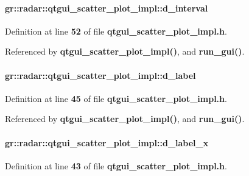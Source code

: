 \paragraph[{d\+\_\+interval}]{ gr\+::radar\+::qtgui\+\_\+scatter\+\_\+plot\+\_\+impl\+::d\+\_\+interval}\label{classgr_1_1radar_1_1qtgui__scatter__plot__impl_a67a3d6aa0cbaaca5b978292cc1c82f67}


Definition at line {\bf 52} of file {\bf qtgui\+\_\+scatter\+\_\+plot\+\_\+impl.\+h}.



Referenced by {\bf qtgui\+\_\+scatter\+\_\+plot\+\_\+impl()}, and {\bf run\+\_\+gui()}.

\paragraph[{d\+\_\+label}]{ gr\+::radar\+::qtgui\+\_\+scatter\+\_\+plot\+\_\+impl\+::d\+\_\+label}\label{classgr_1_1radar_1_1qtgui__scatter__plot__impl_aec4016bb7edaae076eebdef94ab79535}


Definition at line {\bf 45} of file {\bf qtgui\+\_\+scatter\+\_\+plot\+\_\+impl.\+h}.



Referenced by {\bf qtgui\+\_\+scatter\+\_\+plot\+\_\+impl()}, and {\bf run\+\_\+gui()}.

\paragraph[{d\+\_\+label\+\_\+x}]{ gr\+::radar\+::qtgui\+\_\+scatter\+\_\+plot\+\_\+impl\+::d\+\_\+label\+\_\+x}\label{classgr_1_1radar_1_1qtgui__scatter__plot__impl_a1f5ea56838bad470a74e5ab4ca062444}


Definition at line {\bf 43} of file {\bf qtgui\+\_\+scatter\+\_\+plot\+\_\+impl.\+h}.



